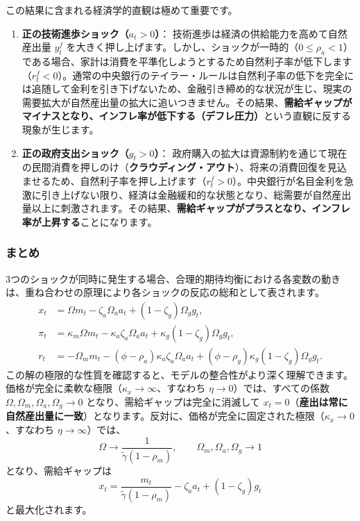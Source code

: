 \documentclass[
  japanese,
  lualatex,
  ja=standard,
  12pt,
  a4paper]{ltjsarticle}
\providecommand{\tightlist}{%
  \setlength{\itemsep}{0pt}\setlength{\parskip}{0pt}}
\begin{document}
この結果に含まれる経済学的直観は極めて重要です。

\begin{enumerate}
\def\labelenumi{\arabic{enumi}.}
\tightlist
\item
  \textbf{正の技術進歩ショック（\(a_t>0\)）}：
  技術進歩は経済の供給能力を高めて自然産出量 \(y_t^f\)
  を大きく押し上げます。しかし、ショックが一時的（\(0\leq\rho_a<1\)）である場合、家計は消費を平準化しようとするため自然利子率が低下します（\(r_t^f<0\)）。通常の中央銀行のテイラー・ルールは自然利子率の低下を完全には追随して金利を引き下げないため、金融引き締め的な状況が生じ、現実の需要拡大が自然産出量の拡大に追いつきません。その結果、\textbf{需給ギャップがマイナスとなり、インフレ率が低下する（デフレ圧力）}という直観に反する現象が生じます。
\item
  \textbf{正の政府支出ショック（\(g_t>0\)）}：
  政府購入の拡大は資源制約を通じて現在の民間消費を押しのけ（\textbf{クラウディング・アウト}）、将来の消費回復を見込ませるため、自然利子率を押し上げます（\(r_t^f>0\)）。中央銀行が名目金利を急激に引き上げない限り、経済は金融緩和的な状態となり、総需要が自然産出量以上に刺激されます。その結果、\textbf{需給ギャップがプラスとなり、インフレ率が上昇する}ことになります。
\end{enumerate}

\subsubsection{まとめ}\label{ux307eux3068ux3081}

\Needspace{0.33\textheight}

3つのショックが同時に発生する場合、合理的期待均衡における各変数の動きは、重ね合わせの原理により各ショックの反応の総和として表されます。
\[
\begin{aligned}
x_t
&=
\Omega m_t
- \zeta_a \Omega_a a_t
+ (1-\zeta_g)\Omega_g g_t,\\
\pi_t
&=
\kappa_m \Omega m_t
- \kappa_a \zeta_a \Omega_a a_t
+ \kappa_g (1-\zeta_g)\Omega_g g_t,\\
r_t
&=
-\Omega_m m_t
-(\phi-\rho_a)\kappa_a\zeta_a\Omega_a a_t
+(\phi-\rho_g)\kappa_g(1-\zeta_g)\Omega_g g_t.
\end{aligned}
\]
この解の極限的な性質を確認すると、モデルの整合性がより深く理解できます。価格が完全に柔軟な極限（\(\kappa_x\to\infty\)、すなわち
\(\eta\to0\)）では、すべての係数
\(\Omega, \Omega_m, \Omega_a, \Omega_g \to 0\)
となり、需給ギャップは完全に消滅して
\(x_t=0\)（\textbf{産出は常に自然産出量に一致}）となります。反対に、価格が完全に固定された極限（\(\kappa_x\to0\)、すなわち
\(\eta\to\infty\)）では、 \[
\Omega\to\frac{1}{\tilde{\gamma}(1-\rho_m)},
\qquad
\Omega_m,\Omega_a,\Omega_g\to1
\] となり、需給ギャップは \[
x_t
=
\frac{m_t}{\tilde{\gamma}(1-\rho_m)}
-\zeta_a a_t
+(1-\zeta_g)g_t
\] と最大化されます。
\end{document}
